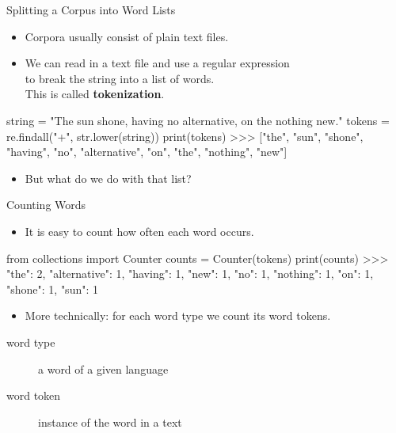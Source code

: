 \documentclass[professionalfonts, xcolor={usenames,svgnames,x11names,table}]{beamer}
\begin{document}
\begin{frame}[fragile]{Splitting a Corpus into Word Lists}
    \begin{itemize}
        \item Corpora usually consist of plain text files.\\
        \item We can read in a text file and use a regular expression\\
            to break the string into a list of words.\\
            This is called \textbf{tokenization}.
    \end{itemize}
\begin{pythoncode}
    string = "The sun shone, having no alternative, on the nothing new."
    tokens = re.findall("\w+", str.lower(string))
    print(tokens)
    >>> ["the", "sun", "shone", "having", "no", "alternative", "on",
         "the", "nothing", "new"]
\end{pythoncode}

    \begin{itemize}
        \item But what do we do with that list?
    \end{itemize}
\end{frame}

\begin{frame}[fragile]{Counting Words}
    \begin{itemize}
        \item It is easy to count how often each word occurs.
    \end{itemize}
\begin{pythoncode}
    from collections import Counter
    counts = Counter(tokens)
    print(counts)
    >>> {"the": 2, "alternative": 1, "having": 1, "new": 1, "no": 1,
         "nothing": 1, "on": 1, "shone": 1, "sun": 1}
\end{pythoncode}
    \begin{itemize}
        \item More technically: for each word type we count its word tokens.
    \end{itemize}
    \begin{description}
        \item[word type] a word of a given language
        \item[word token] instance of the word in a text
    \end{description}
\end{frame}
\end{document}

